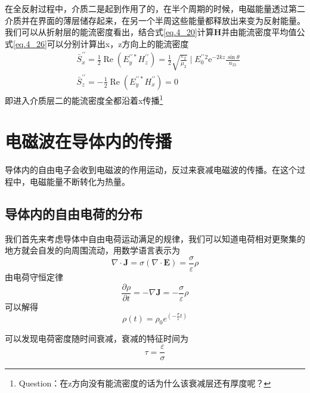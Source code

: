         在全反射过程中，介质二是起到作用了的，在半个周期的时候，电磁能量透过第二介质并在界面的薄层储存起来，在另一个半周这些能量都释放出来变为反射能量。我们可以从折射层的能流密度看出，结合式\ref{eq.4_20}计算$\boldsymbol{H}$并由能流密度平均值公式\ref{eq.4_26}可以分别计算出x，z方向上的能流密度
        \begin{equation}
            \begin{aligned}
            &\bar{S}_{x}^{\prime \prime}=\frac{1}{2} \operatorname{Re}\left(E_{y}^{\prime \prime *} H_{z}^{\prime \prime}\right)=\frac{1}{2} \sqrt{\frac{\varepsilon_{2}}{\mu_{2}}} \mid E_{0}^{\prime \prime}{ }^{2} \mathrm{e}^{-2 kz} \frac{\sin \theta}{n_{21}} \\
            &\bar{S}_{z}^{\prime \prime}=-\frac{1}{2} \operatorname{Re}\left(E_{y}^{\prime \prime *} H_{x}^{\prime \prime}\right)=0
            \end{aligned}
        \end{equation}
        即进入介质层二的能流密度全都沿着x传播\footnote{\textcolor[RGB]{143,143,143}{Question：在z方向没有能流密度的话为什么该衰减层还有厚度呢？}}
\section{电磁波在导体内的传播}
    导体内的自由电子会收到电磁波的作用运动，反过来衰减电磁波的传播。在这个过程中，电磁能量不断转化为热量。
    \subsection{导体内的自由电荷的分布}
        我们首先来考虑导体中自由电荷运动满足的规律，我们可以知道电荷相对更聚集的地方就会自发的向周围流动，用数学语言表示为
        \begin{equation}
            \nabla \cdot \boldsymbol{J} = \sigma (\nabla \cdot \boldsymbol{E}) = \frac{\sigma}{\varepsilon}\rho
        \end{equation}
        由电荷守恒定律\[\frac{\partial \rho}{\partial t}=-\nabla \boldsymbol{J}=-\frac{\sigma}{\varepsilon}\rho\]可以解得
        \begin{equation}
            \rho(t) = \rho_0 e^{(-\frac{\sigma}{\varepsilon}t)}
        \end{equation}

        可以发现电荷密度随时间衰减，衰减的特征时间为
        \begin{equation}
            \tau =\frac{\varepsilon}{\sigma}
        \end{equation}

